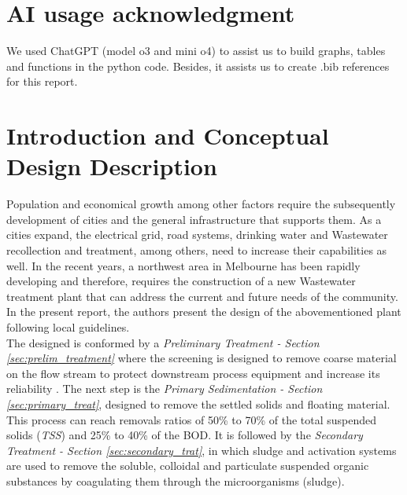 \documentclass[11pt]{article}
\begin{document}
\section*{AI usage acknowledgment}

We used ChatGPT (model o3 and mini o4) to assist us to 
build graphs, tables and functions in the python code. 
Besides, it assists us to create .bib references for this report.

\newpage

\tableofcontents
\listoffigures
\listoftables

\newpage

\pagestyle{fancy}

\setcounter{page}{1}
\sloppy

\section{Introduction and Conceptual Design Description}
Population and economical growth among other factors require the subsequently development of cities and the
general infrastructure that supports them. As a cities expand, the electrical grid, road systems, drinking water and Wastewater
recollection and treatment, among others, need to increase their capabilities as well. In the recent years, a northwest area in
Melbourne has been rapidly developing and therefore, requires the construction of a new Wastewater treatment plant that can 
address the current and future needs of the community. In the present report, the authors present the design of the abovementioned
plant following local guidelines.\\

The designed is conformed by a \textit{Preliminary Treatment - Section \ref{sec:prelim_treatment}} 
where the screening is designed to remove coarse material 
on the flow stream to protect downstream process equipment and 
increase its reliability \cite{metcalf_2014_wastewater}.
The next step is the \textit{Primary Sedimentation - Section \ref{sec:primary_treat}}, 
designed to remove the settled solids and floating material. 
This process can reach removals ratios of 50\% to 70\% of the total 
suspended solids (\textit{TSS}) and 25\% to 40\% of the BOD.
It is followed by the \textit{Secondary Treatment - Section \ref{sec:secondary_trat}}, 
in which sludge and activation systems are used to remove the
soluble, colloidal and particulate suspended organic substances 
by coagulating them through the microorganisms (sludge). \\
\end{document}
